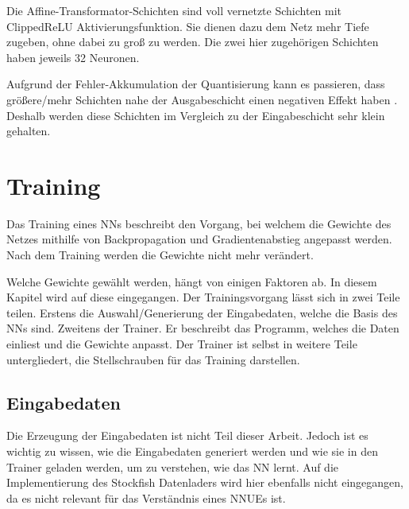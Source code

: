 Die Affine-Transformator-Schichten sind voll vernetzte Schichten mit Clipped\ac{ReLU} Aktivierungsfunktion. Sie dienen dazu dem Netz mehr Tiefe zugeben, ohne dabei zu groß zu werden. Die zwei hier zugehörigen Schichten haben jeweils 32 Neuronen.


Aufgrund der Fehler-Akkumulation der Quantisierung kann es passieren, dass größere/mehr Schichten nahe der Ausgabeschicht einen negativen Effekt haben \cite{StockfishNNUE}. Deshalb werden diese Schichten im Vergleich zu der Eingabeschicht sehr klein gehalten.

\section{Training}

Das Training eines \acp{NN} beschreibt den Vorgang, bei welchem die Gewichte des Netzes mithilfe von Backpropagation und Gradientenabstieg angepasst werden. Nach dem Training werden die Gewichte nicht mehr verändert.

Welche Gewichte gewählt werden, hängt von einigen Faktoren ab. In diesem Kapitel wird auf diese eingegangen. Der Trainingsvorgang lässt sich in zwei Teile teilen. Erstens die Auswahl/Generierung der Eingabedaten, welche die Basis des \acp{NN} sind. Zweitens der Trainer. Er beschreibt das Programm, welches die Daten einliest und die Gewichte anpasst. Der Trainer ist selbst in weitere Teile untergliedert, die Stellschrauben für das Training darstellen.

\subsection{Eingabedaten}
\label{chap:inputdata}

Die Erzeugung der Eingabedaten ist nicht Teil dieser Arbeit. Jedoch ist es wichtig zu wissen, wie die Eingabedaten generiert werden und wie sie in den Trainer geladen werden, um zu verstehen, wie das \ac{NN} lernt. Auf die Implementierung des Stockfish Datenladers wird hier ebenfalls nicht eingegangen, da es nicht relevant für das Verständnis eines \acp{NNUE} ist.

